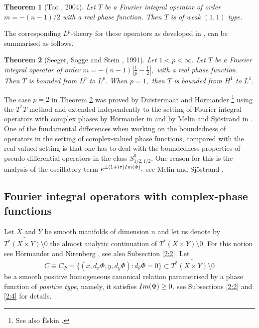 \documentclass[12pt, reqno]{amsart}
\newtheorem{theorem}{Theorem}[section]
\theoremstyle{definition}
\theoremstyle{remark}
\numberwithin{equation}{section}
\begin{document}
\begin{theorem}[Tao \cite{Tao}, 2004]\label{Tao:theorem} Let $T$ be a Fourier integral operator of order $m=-(n-1)/2$ with a real phase function. Then $T$ is of weak $(1,1)$ type.    
\end{theorem}

The corresponding $L^p$-theory for these operators as developed in \cite{SSS}, can be summarised as follows.
\begin{theorem}[Seeger, Sogge and Stein \cite{SSS}, 1991]\label{SSS:th} Let $1<p<\infty.$ Let $T$ be a Fourier integral operator of order $m=-(n-1)|\frac{1}{p}-\frac{1}{2}|,$ with a real phase function. Then $T$ is bounded from $L^p$ to $L^p.$ When $p=1,$ then $T$ is bounded from $H^1$ to $L^1.$
\end{theorem}
The case $p=2$ in Theorem \ref{SSS:th} was proved by Duistermaat and H\"ormander  \cite{Duistermaat-Hormander:FIOs-2}\footnote{See also Èskin \cite{Eskin1970}.} using the $T^*T$-method and extended independently to the setting of Fourier integral operators with complex phases by H\"ormander in \cite{Ho2} and by Melin and Sj\"ostrand in \cite{Melin:Sjostrand1976}. One of the fundamental differences when working on the boundedness of operators in the setting of complex-valued phase functions, compared with the real-valued setting is that one has to deal with the boundedness properties of pseudo-differential operators in the class $S^{0}_{1/2,1/2}.$ One reason for this is the analysis of the oscillatory term $e^{\pm (1+i\tau)\textnormal{Im}(\Phi)},$ see Melin and Sj\"ostrand \cite[Page 394]{Melin:Sjostrand1976}.

\subsection{Fourier integral operators with complex-phase functions} Let $X$ and $Y$ be smooth manifolds of dimension $n$ and let us denote by $\widetilde{ T^*(X\times Y)\setminus 0}$  the almost analytic continuation of  $ T^*(X\times Y)\setminus 0.$ For this notion see H\"ormander \cite{Hormander1969} and Nirenberg \cite{Nirenberg71}, see also Subsection \ref{2:2}. Let   $$  C\equiv C_{\Phi}=\{(x,d_x\Phi,y, d_y\Phi):d_\theta \Phi=0\}\subset\widetilde{ T^*(X\times Y)\setminus 0}$$  be a smooth positive homogeneous canonical relation parametrised by a phase function of {\it positive type}, namely, it satisfies $\textnormal{Im}(\Phi)\geq 0,$ see Subsections \ref{2:2} and \ref{2:4} for details. 
\end{document}

